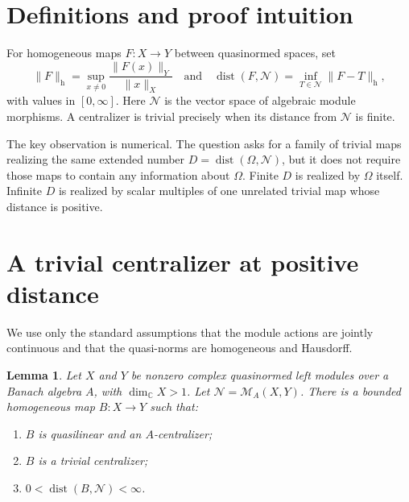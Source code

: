 \documentclass[11pt]{article}
\newtheorem{lemma}{Lemma}
\newcommand{\dist}{\operatorname{dist}}
\newcommand{\N}{\mathscr N}
\begin{document}
\section{Definitions and proof intuition}

For homogeneous maps $F:X\to Y$ between quasinormed spaces, set
\[
 \|F\|_{\mathrm h}=\sup_{x\ne0}\frac{\|F(x)\|_Y}{\|x\|_X}
 \quad\text{and}\quad
 \dist(F,\N)=\inf_{T\in\N}\|F-T\|_{\mathrm h},
\]
with values in $[0,\infty]$.  Here $\N$ is the vector space of algebraic
module morphisms.  A centralizer is trivial precisely when its distance from
$\N$ is finite.

The key observation is numerical.  The question asks for a family of trivial
maps realizing the same extended number $D=\dist(\Omega,\N)$, but it does not
require those maps to contain any information about $\Omega$.  Finite $D$ is
realized by $\Omega$ itself.  Infinite $D$ is realized by scalar multiples of
one unrelated trivial map whose distance is positive.

\section{A trivial centralizer at positive distance}

We use only the standard assumptions that the module actions are jointly
continuous and that the quasi-norms are homogeneous and Hausdorff.

\begin{lemma}\label{positive-map}
Let $X$ and $Y$ be nonzero complex quasinormed left modules over a Banach
algebra $A$, with $\dim_{\mathbb C}X>1$.  Let
$\N=\mathscr{M}_A(X,Y)$.  There is a bounded homogeneous map
$B:X\to Y$ such that:
\begin{enumerate}
\item $B$ is quasilinear and an $A$-centralizer;
\item $B$ is a trivial centralizer;
\item $0<\dist(B,\N)<\infty$.
\end{enumerate}
\end{lemma}
\end{document}

